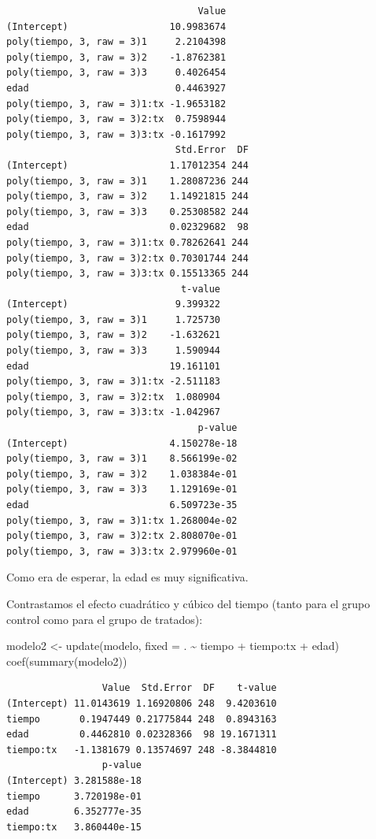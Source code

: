\documentclass[
]{book}
\newenvironment{Shaded}{\begin{snugshade}}{\end{snugshade}}
\newcommand{\AttributeTok}[1]{\textcolor[rgb]{0.77,0.63,0.00}{#1}}
\newcommand{\FunctionTok}[1]{\textcolor[rgb]{0.00,0.00,0.00}{#1}}
\newcommand{\NormalTok}[1]{#1}
\newcommand{\OtherTok}[1]{\textcolor[rgb]{0.56,0.35,0.01}{#1}}
\newcommand{\SpecialCharTok}[1]{\textcolor[rgb]{0.00,0.00,0.00}{#1}}
\begin{document}
\begin{verbatim}
                                  Value
(Intercept)                  10.9983674
poly(tiempo, 3, raw = 3)1     2.2104398
poly(tiempo, 3, raw = 3)2    -1.8762381
poly(tiempo, 3, raw = 3)3     0.4026454
edad                          0.4463927
poly(tiempo, 3, raw = 3)1:tx -1.9653182
poly(tiempo, 3, raw = 3)2:tx  0.7598944
poly(tiempo, 3, raw = 3)3:tx -0.1617992
                              Std.Error  DF
(Intercept)                  1.17012354 244
poly(tiempo, 3, raw = 3)1    1.28087236 244
poly(tiempo, 3, raw = 3)2    1.14921815 244
poly(tiempo, 3, raw = 3)3    0.25308582 244
edad                         0.02329682  98
poly(tiempo, 3, raw = 3)1:tx 0.78262641 244
poly(tiempo, 3, raw = 3)2:tx 0.70301744 244
poly(tiempo, 3, raw = 3)3:tx 0.15513365 244
                               t-value
(Intercept)                   9.399322
poly(tiempo, 3, raw = 3)1     1.725730
poly(tiempo, 3, raw = 3)2    -1.632621
poly(tiempo, 3, raw = 3)3     1.590944
edad                         19.161101
poly(tiempo, 3, raw = 3)1:tx -2.511183
poly(tiempo, 3, raw = 3)2:tx  1.080904
poly(tiempo, 3, raw = 3)3:tx -1.042967
                                  p-value
(Intercept)                  4.150278e-18
poly(tiempo, 3, raw = 3)1    8.566199e-02
poly(tiempo, 3, raw = 3)2    1.038384e-01
poly(tiempo, 3, raw = 3)3    1.129169e-01
edad                         6.509723e-35
poly(tiempo, 3, raw = 3)1:tx 1.268004e-02
poly(tiempo, 3, raw = 3)2:tx 2.808070e-01
poly(tiempo, 3, raw = 3)3:tx 2.979960e-01
\end{verbatim}

Como era de esperar, la edad es muy significativa.

Contrastamos el efecto cuadrático y cúbico del tiempo (tanto para el grupo control como para el grupo de tratados):

\begin{Shaded}
\begin{Highlighting}[]
\NormalTok{modelo2 }\OtherTok{\textless{}{-}} \FunctionTok{update}\NormalTok{(modelo, }\AttributeTok{fixed =}\NormalTok{ . }\SpecialCharTok{\textasciitilde{}}\NormalTok{ tiempo }\SpecialCharTok{+}\NormalTok{ tiempo}\SpecialCharTok{:}\NormalTok{tx }\SpecialCharTok{+}\NormalTok{ edad)}
\FunctionTok{coef}\NormalTok{(}\FunctionTok{summary}\NormalTok{(modelo2))}
\end{Highlighting}
\end{Shaded}

\begin{verbatim}
                 Value  Std.Error  DF    t-value
(Intercept) 11.0143619 1.16920806 248  9.4203610
tiempo       0.1947449 0.21775844 248  0.8943163
edad         0.4462810 0.02328366  98 19.1671311
tiempo:tx   -1.1381679 0.13574697 248 -8.3844810
                 p-value
(Intercept) 3.281588e-18
tiempo      3.720198e-01
edad        6.352777e-35
tiempo:tx   3.860440e-15
\end{verbatim}
\end{document}
